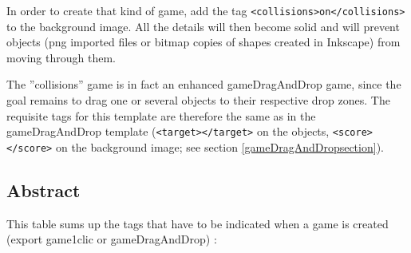 In order to create that kind of game, add the tag \verb|<collisions>on</collisions>| to the 
background image. All the details will then become solid and will prevent objects 
(png imported files or bitmap copies of shapes created in Inkscape) from moving through them.

The ''collisions'' game is in fact an enhanced gameDragAndDrop game, since the goal remains to 
drag one or several objects to their respective drop zones. The requisite tags for this template are 
therefore the same as in the gameDragAndDrop template (\verb|<target></target>| on the objects, \verb|<score></score>| 
on the background image; see section \ref{gameDragAndDropsection}).

\subsection{Abstract}

This table sums up the tags that have to be indicated when a game is created 
 (export game1clic or gameDragAndDrop) :
 
